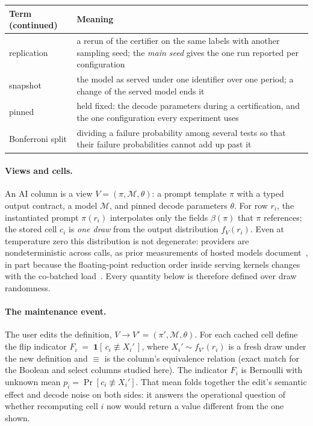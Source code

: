 \begin{table}[t]
\begin{minipage}[t]{0.49\textwidth}
\vspace{6pt}
\begin{tabular}{@{}>{\raggedright\arraybackslash}p{1.9cm}>{\raggedright\arraybackslash}p{6.2cm}@{}}
\toprule
Term (continued) & Meaning \\
\midrule
replication & a rerun of the certifier on the same labels with another sampling seed; the \emph{main seed} gives the one run reported per configuration \\
snapshot & the model as served under one identifier over one period; a change of the served model ends it \\
pinned & held fixed: the decode parameters during a certification, and the one configuration every experiment uses \\
Bonferroni split & dividing a failure probability among several tests so that their failure probabilities cannot add up past it \\
\bottomrule
\end{tabular}
\end{minipage}
\end{table}

\keeprunin
\paragraph{Views and cells.} An AI column is a view $V=(\pi, \mathcal{M}, \theta)$:
a prompt template $\pi$ with a typed output contract, a model $\mathcal{M}$, and
pinned decode parameters $\theta$. For row $r_i$, the instantiated prompt
$\pi(r_i)$ interpolates only the fields $\beta(\pi)$ that $\pi$
references; the stored cell $c_i$ is \emph{one draw} from the output
distribution $f_V(r_i)$. Even at temperature zero this distribution is
not degenerate: providers are nondeterministic across calls, as prior
measurements of hosted models document~\cite{ouyang,atil}, in part
because the floating-point reduction order inside serving kernels
changes with the co-batched load~\cite{yuan,tml}. Every quantity
below is therefore defined over draw randomness.

\keeprunin
\paragraph{The maintenance event.} The user edits the definition,
$V \to V' = (\pi', \mathcal{M}, \theta)$. For each cached cell define the flip
indicator
$F_i \;=\; \mathbf{1}\!\left[\, c_i \not\equiv X_i' \,\right]$,
where $X_i' \sim f_{V'}(r_i)$ is a fresh draw under the new definition
and $\equiv$ is the column's equivalence relation (exact match for the
Boolean and select columns studied here). The indicator $F_i$ is
Bernoulli with unknown mean $p_i = \Pr[c_i \not\equiv X_i']$. That mean
folds together the edit's semantic effect and decode noise
on both sides: it answers the operational question of whether
recomputing cell $i$ now would return a value different from the one
shown.

